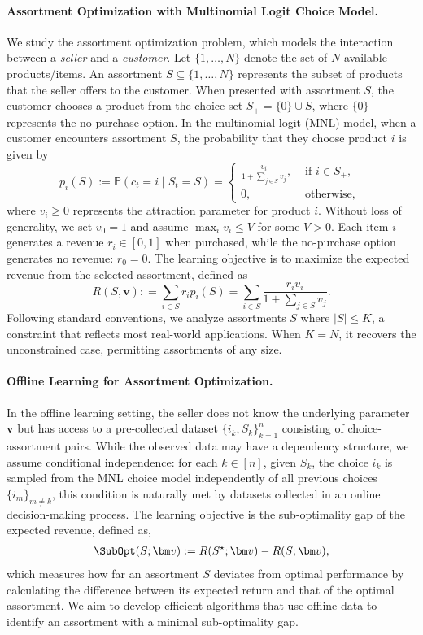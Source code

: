 \documentclass[10pt, letterpaper]{article}
\begin{document}
\paragraph{Assortment Optimization with Multinomial Logit Choice Model.} 
We study the assortment optimization problem, which models the interaction between a \emph{seller} and a \emph{customer}. Let $\{1, \ldots, N\}$ denote the set of $N$ available products/items. An assortment $S \subseteq \{1, \ldots, N\}$ represents the subset of products that the seller offers to the customer. When presented with assortment $S$, the customer chooses a product from the choice set $S_+ = \{0\} \cup S$, where $\{0\}$ represents the no-purchase option. In the multinomial logit (MNL) model, when a customer encounters assortment $S$, the probability that they choose product $i$ is given by
$$p_i(S):=\mathbb{P}\left(c_t=i \mid S_t=S\right)= \begin{cases}\frac{v_i}{1+\sum_{j \in S} v_j}, & \text { if } i \in S_+,  \\ 0, & \text { otherwise, }\end{cases}$$
where $v_i \geq 0$ represents the attraction parameter for product $i$. Without loss of generality, we set $v_0 = 1$ and assume $ \max_i v_i\leq V$ for some $V>0$. Each item $i$ generates a revenue $r_i \in [0,1]$ when purchased, while the no-purchase option generates no revenue: $r_0 = 0$. The learning objective is to maximize the expected revenue from the selected assortment, defined as
$$
R(S, \bm v): = \sum_{i\in S} r_i p_i(S) = \sum_{i\in S} \frac{r_i v_i}{1+\sum_{j\in S} v_j}.
$$
Following standard conventions, we analyze assortments $S$ where $|S| \leq K$, a constraint that reflects most real-world applications. 
When $K = N$, it recovers the unconstrained case, permitting assortments of any size.

\paragraph{Offline Learning for Assortment Optimization.} 
In the offline learning setting, the seller does not know the underlying parameter $\bm{v}$ but has access to a pre-collected dataset $\{i_k,S_k\}_{k = 1}^n$ consisting of choice-assortment pairs. 
While the observed data may have a dependency structure, we assume conditional independence: for each $k \in [n]$, given $S_k$, the choice $i_k$ is sampled from the MNL choice model independently of all previous choices $\{i_m\}_{m \neq k}$, this condition is naturally met by datasets collected in an online decision-making process. 
The learning objective is the sub-optimality gap of the expected revenue, defined as,
\begin{align*}
\SubOpt(S;\bm v) :=  R(S^\star;\bm v) - R(S;\bm v),
\end{align*}
which measures how far an assortment $S$ deviates from optimal performance by calculating the difference between its expected return and that of the optimal assortment. We aim to develop efficient algorithms that use offline data to identify an assortment with a minimal sub-optimality gap. 
\end{document}
